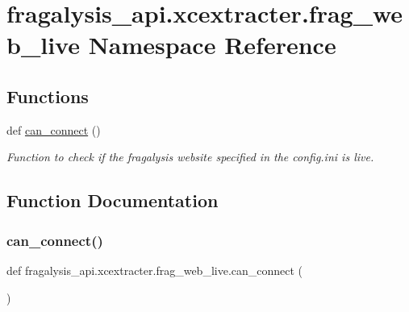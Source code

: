 \hypertarget{namespacefragalysis__api_1_1xcextracter_1_1frag__web__live}{}\section{fragalysis\+\_\+api.\+xcextracter.\+frag\+\_\+web\+\_\+live Namespace Reference}
\label{namespacefragalysis__api_1_1xcextracter_1_1frag__web__live}
\subsection*{Functions}
\begin{DoxyCompactItemize}
\item 
def \hyperlink{namespacefragalysis__api_1_1xcextracter_1_1frag__web__live_a0c358bb08db16e67b947ea3e06a2516c}{can\+\_\+connect} ()
\begin{DoxyCompactList}\small\item\em Function to check if the fragalysis website specified in the config.\+ini is live. \end{DoxyCompactList}\end{DoxyCompactItemize}


\subsection{Function Documentation}
\mbox{\label{namespacefragalysis__api_1_1xcextracter_1_1frag__web__live_a0c358bb08db16e67b947ea3e06a2516c}} 
\subsubsection{\texorpdfstring{can\+\_\+connect()}{can\_connect()}}
{\footnotesize\ttfamily def fragalysis\+\_\+api.\+xcextracter.\+frag\+\_\+web\+\_\+live.\+can\+\_\+connect (\begin{DoxyParamCaption}{ }\end{DoxyParamCaption})}



